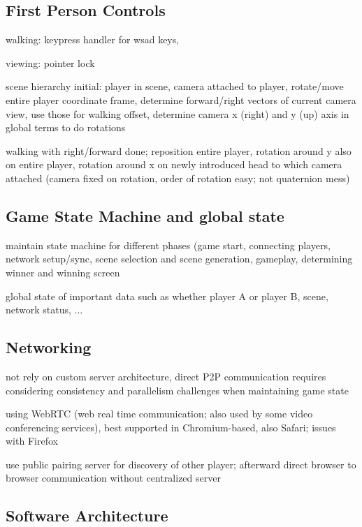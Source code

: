 \documentclass[11pt]{article}
\begin{document}
\subsection{First Person Controls}
\par walking: keypress handler for wsad keys, 
\par viewing: pointer lock
\par scene hierarchy initial: player in scene, camera attached to player, rotate/move entire player coordinate frame, determine forward/right vectors of current camera view, use those for walking offset, determine camera x (right) and y (up) axis in global terms to do rotations
\par walking with right/forward done; reposition entire player, rotation around y also on entire player, rotation around x on newly introduced head to which camera attached (camera fixed on rotation, order of rotation easy; not quaternion mess)

\subsection{Game State Machine and global state}
\par maintain state machine for different phases (game start, connecting players, network setup/sync, scene selection and scene generation, gameplay, determining winner and winning screen
\par global state of important data such as whether player A or player B, scene, network status, ...

\subsection{Networking}
\par not rely on custom server architecture, direct P2P communication
requires considering consistency and parallelism challenges when maintaining game state
\par using WebRTC (web real time communication; also used by some video conferencing services), best supported in Chromium-based, also Safari; issues with Firefox
\par use public pairing server for discovery of other player; afterward direct browser to browser communication without centralized server

\subsection{Software Architecture}
\end{document}
